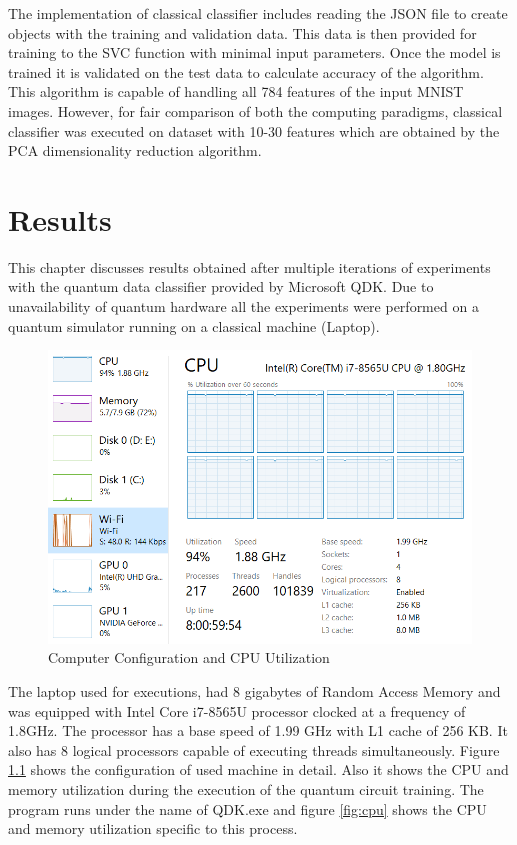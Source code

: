 \documentclass[english,a4paper,11pt,oneside,onecolumn]{book}
\begin{document}
The implementation of classical classifier includes reading the JSON file to create objects with the training and validation data. This data is then provided for training to the SVC function with minimal input parameters. Once the model is trained it is validated on the test data to calculate accuracy of the algorithm. This algorithm is capable of handling all 784 features of the input MNIST images. However, for fair comparison of both the computing paradigms, classical classifier was executed on dataset with 10-30 features which are obtained by the PCA dimensionality reduction algorithm.

\chapter{Results}
\label{sec:resEval}
This chapter discusses results obtained after multiple iterations of experiments with the quantum data classifier provided by Microsoft QDK. Due to unavailability of quantum hardware all the experiments were performed on a quantum simulator running on a classical machine (Laptop). 

\begin{figure}[H]
    \centering
    \includegraphics[scale=0.9]{Images/CPUandMemoryUtilization2.PNG}
    \caption{Computer Configuration and CPU Utilization}
    \label{fig:cpuConfig}
\end{figure}

The laptop used for executions, had 8 gigabytes of Random Access Memory and was equipped with Intel Core i7-8565U processor clocked at a frequency of 1.8GHz. The processor has a base speed of 1.99 GHz with L1 cache of 256 KB. It also has 8 logical processors capable of executing threads simultaneously. Figure \ref{fig:cpuConfig} shows the configuration of used machine in detail. Also it shows the CPU and memory utilization during the execution of the quantum circuit training. The program runs under the name of QDK.exe and figure \ref{fig:cpu} shows the CPU and memory utilization specific to this process.
\end{document}
